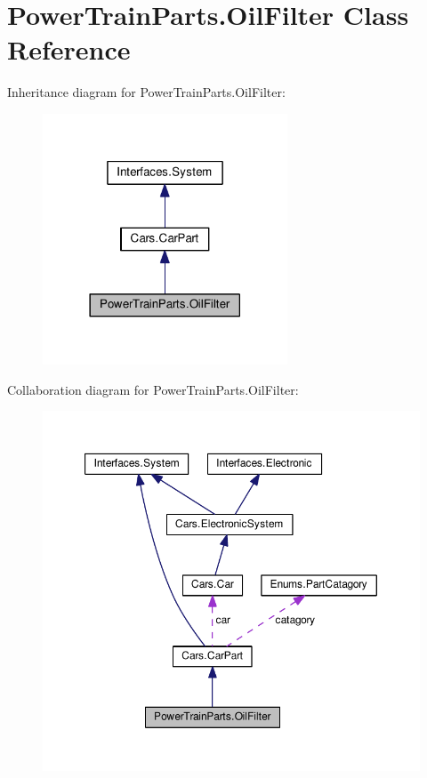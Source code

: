 \hypertarget{classPowerTrainParts_1_1OilFilter}{}\section{Power\+Train\+Parts.\+Oil\+Filter Class Reference}
\label{classPowerTrainParts_1_1OilFilter}


Inheritance diagram for Power\+Train\+Parts.\+Oil\+Filter\+:\nopagebreak
\begin{figure}[H]
\begin{center}
\leavevmode
\includegraphics[width=206pt]{classPowerTrainParts_1_1OilFilter__inherit__graph}
\end{center}
\end{figure}


Collaboration diagram for Power\+Train\+Parts.\+Oil\+Filter\+:\nopagebreak
\begin{figure}[H]
\begin{center}
\leavevmode
\includegraphics[width=350pt]{classPowerTrainParts_1_1OilFilter__coll__graph}
\end{center}
\end{figure}
